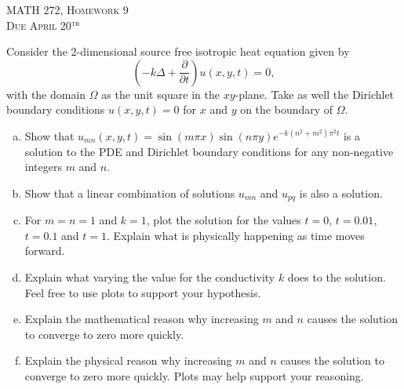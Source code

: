 \documentclass[12pt]{article} %
\begin{document}
\begin{center}
   \textsc{\large MATH 272, Homework 9}\\
   \textsc{Due April 20$^\textrm{th}$}
\end{center}
\vspace{.5cm}

\begin{problem}
    Consider the 2-dimensional source free isotropic heat equation given by
    \[
    \left( -k \Delta + \frac{\partial}{\partial t} \right) u(x,y,t) = 0,
    \]
    with the domain $\Omega$ as the unit square in the $xy$-plane. Take as well the Dirichlet boundary conditions $u(x,y,t)=0$ for $x$ and $y$ on the boundary of $\Omega$.
    \begin{enumerate}[(a)]
        \item Show that $u_{mn}(x,y,t)=\sin(m\pi x)\sin(n\pi y)e^{-k(n^2+m^2)\pi^2 t}$ is a solution to the PDE and Dirichlet boundary conditions for any non-negative integers $m$ and $n$.
        \item Show that a linear combination of solutions $u_{mn}$ and $u_{pq}$ is also a solution.
        \item For $m=n=1$ and $k=1$, plot the solution for the values $t=0$, $t=0.01$, $t=0.1$ and $t=1$.  Explain what is physically happening as time moves forward.
        \item Explain what varying the value for the conductivity $k$ does to the solution.  Feel free to use plots to support your hypothesis.
        \item Explain the mathematical reason why increasing $m$ and $n$ causes the solution to converge to zero more quickly.
        \item Explain the physical reason why increasing $m$ and $n$ causes the solution to converge to zero more quickly. Plots may help support your reasoning.
    \end{enumerate}
\end{problem}
\end{document}
